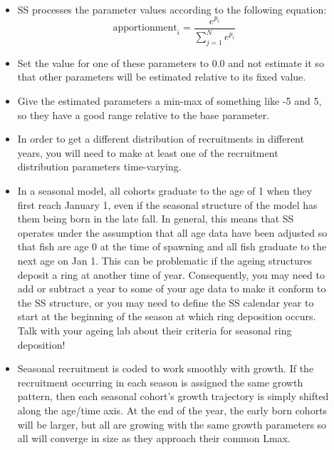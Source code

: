 \begin{description}
	\item[ ]\
	\begin{itemize}
		\item SS processes the parameter values according to the following equation:
		\begin{equation}
		\text{apportionment}_i = \frac{e^{p_i}}{\sum_{j=1}^{N}e^{p_i}}
		\end{equation}
		\item Set the value for one of these parameters to 0.0 and not estimate it so that other parameters will be estimated relative to its fixed value.
		\item Give the estimated parameters a min-max of something like -5 and 5, so they have a good range relative to the base parameter.
		\item In order to get a different distribution of recruitments in different years, you will need to make at least one of the recruitment distribution parameters time-varying.
		\item In a seasonal model, all cohorts graduate to the age of 1 when they first reach January 1, even if the seasonal structure of the model has them being born in the late fall.  In general, this means that SS operates under the assumption that all age data have been adjusted so that fish are age 0 at the time of spawning and all fish graduate to the next age on Jan 1.  This can be problematic if the ageing structures deposit a ring at another time of year.  Consequently, you may need to add or subtract a year to some of your age data to make it conform to the SS structure, or you may need to define the SS calendar year to start at the beginning of the season at which ring deposition occurs.  Talk with your ageing lab about their criteria for seasonal ring deposition!
		\item Seasonal recruitment is coded to work smoothly with growth.  If the recruitment occurring in each season is assigned the same growth pattern, then each seasonal cohort’s growth trajectory is simply shifted along the age/time axis.  At the end of the year, the early born cohorts will be larger, but all are growing with the same growth parameters so all will converge in size as they approach their common Lmax.

\end{itemize}
\end{description}
